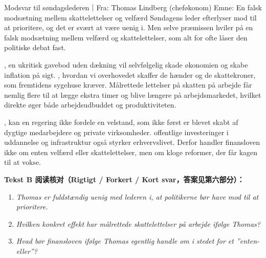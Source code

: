 \begin{emailbox}{Modsvar til søndagslederen｜Fra: Thomas Lindberg (cheføkonom) \quad Emne: En falsk modsætning mellem skattelettelser og velfærd}
Søndagens leder efterlyser mod til at prioritere, og det er svært at være uenig i. Men selve præmissen hviler på en falsk modsætning mellem velfærd og skattelettelser, som alt for ofte låser den politiske debat fast.

, en ukritisk gavebod uden dækning vil selvfølgelig skade økonomien og skabe inflation på sigt. , hvordan vi overhovedet skaffer de hænder og de skattekroner, som fremtidens sygehuse kræver. Målrettede lettelser på skatten på arbejde får nemlig flere til at lægge ekstra timer og blive længere på arbejdsmarkedet, hvilket direkte øger både arbejdsudbuddet og produktiviteten.

, kan en regering ikke fordele en velstand, som ikke først er blevet skabt af dygtige medarbejdere og private virksomheder.  offentlige investeringer i uddannelse og infrastruktur også styrker erhvervslivet. Derfor handler finansloven ikke om enten velfærd eller skattelettelser, men om kloge reformer, der får kagen til at vokse.
\end{emailbox}

\textbf{Tekst B 阅读核对（Rigtigt / Forkert / Kort svar，答案见第六部分）：}
\begin{enumerate}
  \item \textit{Thomas er fuldstændig uenig med lederen i, at politikerne bør have mod til at prioritere.} \underline{\hspace{2.2cm}}
  \item \textit{Hvilken konkret effekt har målrettede skattelettelser på arbejde ifølge Thomas?} \underline{\hspace{2.2cm}}
  \item \textit{Hvad bør finansloven ifølge Thomas egentlig handle om i stedet for et ”enten-eller”?} \underline{\hspace{2.2cm}}
\end{enumerate}

